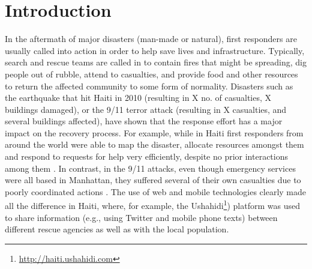 \section{Introduction}
In the aftermath of major disasters (man-made or natural), first responders  are usually called into action in order to help save lives and infrastructure. Typically, search and rescue teams are called in to contain fires that might be spreading, dig people out of rubble, attend to casualties, and provide food and other resources to return the affected community to some form of normality. Disasters such as the earthquake that hit Haiti in 2010 (resulting in X no. of casualties, X buildings damaged), or the 9/11 terror attack (resulting in X casualties, and several buildings affected), have shown that the response effort has a major impact on the recovery process. For example, while in Haiti first responders from around the world were able to map the disaster, allocate resources amongst them and respond to requests for help very efficiently, despite no prior interactions among them \cite{[ushahidi]}. In contrast, in the 9/11 attacks, even though emergency services were all based in Manhattan, they suffered several of their own casualties due to poorly coordinated actions \cite{911report}. The use of web and mobile technologies clearly made all the difference in Haiti, where, for example, the Ushahidi\footnote{\url{http://haiti.ushahidi.com}})  platform was used to share information (e.g., using Twitter and mobile phone texts) between different rescue agencies as well as with the local population. 

